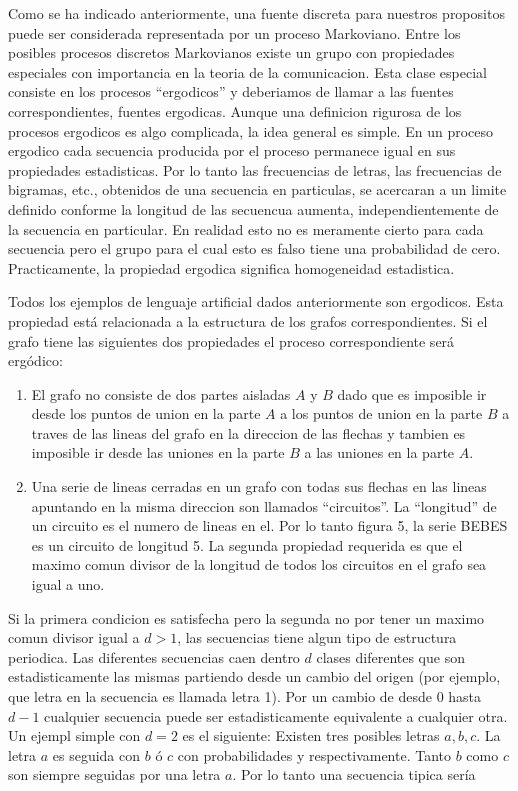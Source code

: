 Como se ha indicado anteriormente, una fuente discreta para nuestros
propositos puede ser considerada representada por un proceso
Markoviano. Entre los posibles procesos discretos Markovianos existe
un grupo con propiedades especiales con importancia en la teoria de la
comunicacion. Esta clase especial consiste en los procesos
``ergodicos'' y deberiamos de llamar a las fuentes correspondientes,
fuentes ergodicas. Aunque una definicion rigurosa de los procesos
ergodicos es algo complicada, la idea general es simple. En un proceso
ergodico cada secuencia producida por el proceso permanece igual en
sus propiedades estadisticas. Por lo tanto las frecuencias de letras,
las frecuencias de bigramas, etc., obtenidos de una secuencia en
particulas, se acercaran a un limite definido conforme la longitud de
las secuencua aumenta, independientemente de la secuencia en
particular. En realidad esto no es meramente cierto para cada
secuencia pero el grupo para el cual esto es falso tiene una
probabilidad de cero. Practicamente, la propiedad ergodica significa
homogeneidad estadistica.

Todos los ejemplos de lenguaje artificial dados anteriormente son
ergodicos. Esta propiedad est\'{a} relacionada a la estructura de los
grafos correspondientes. Si el grafo tiene las siguientes dos
propiedades el proceso correspondiente ser\'{a} erg\'{o}dico:

\begin{enumerate}
  \item El grafo no consiste de dos partes aisladas $A$ y $B$ dado que es
   imposible ir desde los puntos de union en la parte $A$ a los puntos
   de union en la parte $B$ a traves de las lineas del grafo en la
   direccion de las flechas y tambien es imposible ir desde las
   uniones en la parte $B$ a las uniones en la parte $A$.
 \item Una serie de lineas cerradas en un grafo con todas sus flechas en las lineas
   apuntando en la misma direccion son llamados ``circuitos''.
   La ``longitud'' de un circuito es el numero de lineas en el.
   Por lo tanto figura 5, la serie BEBES es un circuito de longitud 5.
   La segunda propiedad requerida es que el maximo comun divisor
   de la longitud de todos los circuitos en el grafo sea igual a uno.
\end{enumerate}


Si la primera condicion es satisfecha pero la segunda no por tener
un maximo comun divisor igual a $d > 1$, las secuencias tiene algun tipo
de estructura periodica. Las diferentes secuencias caen dentro $d$ clases diferentes
que son estadisticamente las mismas partiendo desde un cambio
del origen (por ejemplo, que letra en la secuencia es llamada letra 1). Por un cambio
de desde $0$ hasta $d - 1$ cualquier secuencia puede ser
estadisticamente equivalente a cualquier otra. Un ejempl simple
con $d = 2$ es el siguiente: Existen tres posibles letras $a, b , c$.
La letra $a$ es seguida con $b$ \'{o} $c$ con
probabilidades  y  respectivamente.
Tanto $b$ como $c$ son siempre seguidas por una letra $a$. Por lo tanto una
secuencia tipica ser\'{i}a

